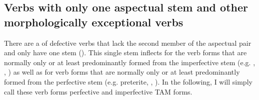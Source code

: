 \subsection{Verbs with only one aspectual stem and other morphologically exceptional verbs}
\label{ssec:Verbs with only one aspectual stem} 
There are a  of defective verbs that lack the second member of the aspectual pair and only have one stem (). This single stem inflects for the verb forms that are normally only or at least predominantly formed from the imperfective stem (e.g. , , ) as well as for verb forms that are normally only or at least predominantly formed from the perfective stem (e.g. preterite, , ). In the following, I will simply call these verb forms perfective and imperfective TAM forms.
%
